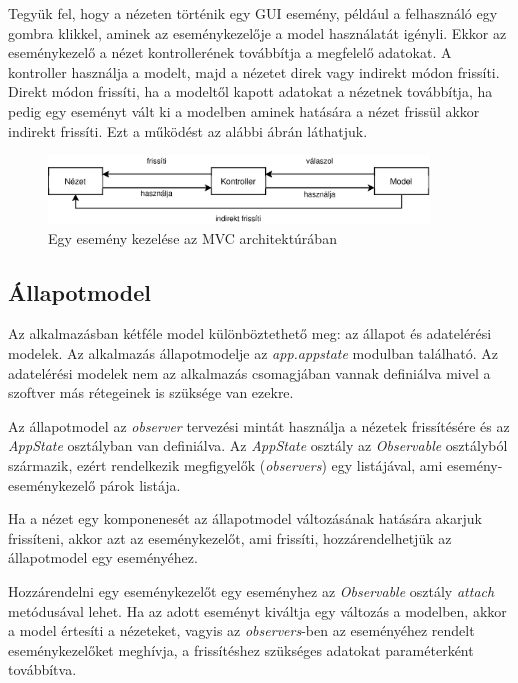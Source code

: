 Tegyük fel, hogy a nézeten történik egy GUI esemény, például a felhasználó egy gombra klikkel,
aminek az eseménykezelője a model használatát igényli.
Ekkor az eseménykezelő a nézet kontrollerének továbbítja a megfelelő adatokat.
A kontroller használja a modelt, majd a nézetet direk vagy indirekt módon frissíti.
Direkt módon frissíti, ha a modeltől kapott adatokat a nézetnek továbbítja,
ha pedig egy eseményt vált ki a modelben aminek hatására a nézet frissül akkor indirekt frissíti.
Ezt a működést az alábbi ábrán láthatjuk.

\begin{figure}[H]
	\centering
	\includegraphics[width=0.9\textwidth]{images/figs/mvc.eps}
	\caption{Egy esemény kezelése az MVC architektúrában}
\end{figure}

\subsection{Állapotmodel}

Az alkalmazásban kétféle model különböztethető meg: az állapot és adatelérési modelek.
Az alkalmazás állapotmodelje az \emph{app.appstate} modulban található.
Az adatelérési modelek nem az alkalmazás csomagjában vannak definiálva mivel 
a szoftver más rétegeinek is szüksége van ezekre.

Az állapotmodel az \emph{observer} tervezési mintát használja a nézetek frissítésére
és az \emph{AppState} osztályban van definiálva.
Az \emph{AppState} osztály az \emph{Observable} osztályból származik,
ezért rendelkezik megfigyelők (\emph{observers}) egy listájával,
ami esemény-eseménykezelő párok listája.

Ha a nézet egy komponenesét az állapotmodel változásának hatására akarjuk frissíteni,
akkor azt az eseménykezelőt, ami frissíti, hozzárendelhetjük az állapotmodel egy eseményéhez.

Hozzárendelni egy eseménykezelőt egy eseményhez az \emph{Observable} osztály \emph{attach}
metódusával lehet.
Ha az adott eseményt kiváltja egy változás a modelben, akkor a model értesíti a nézeteket,
vagyis az \emph{observers}-ben az eseményéhez rendelt eseménykezelőket meghívja,
a frissítéshez szükséges adatokat paraméterként továbbítva.

